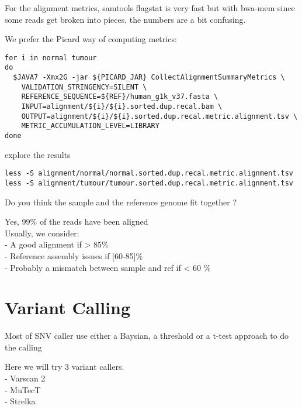 For the alignment metrics, samtools flagstat is very fast but with bwa-mem since some reads get broken into pieces, the numbers are a bit confusing. 

We prefer the Picard way of computing metrics:
\begin{lstlisting}
for i in normal tumour
do
  $JAVA7 -Xmx2G -jar ${PICARD_JAR} CollectAlignmentSummaryMetrics \
    VALIDATION_STRINGENCY=SILENT \
    REFERENCE_SEQUENCE=${REF}/human_g1k_v37.fasta \
    INPUT=alignment/${i}/${i}.sorted.dup.recal.bam \
    OUTPUT=alignment/${i}/${i}.sorted.dup.recal.metric.alignment.tsv \
    METRIC_ACCUMULATION_LEVEL=LIBRARY
done
\end{lstlisting}

explore the results

\begin{lstlisting}
less -S alignment/normal/normal.sorted.dup.recal.metric.alignment.tsv
less -S alignment/tumour/tumour.sorted.dup.recal.metric.alignment.tsv
\end{lstlisting}

\begin{questions}
Do you think the sample and the reference genome fit together ?
\end{questions}
\begin{answer}
Yes, 99\% of the reads have been aligned \\
Usually, we consider:  \\
   - A good alignment if > 85\% \\
   - Reference assembly issues if [60-85]\% \\
   - Probably a mismatch between sample and ref if < 60 \%
\end{answer}




\newpage


\section{Variant Calling}

Most of SNV caller use either a Baysian, a threshold or a t-test approach to do the calling

 Here we will try 3 variant callers.\\
- Varscan 2 \\
- MuTecT \\
- Strelka

